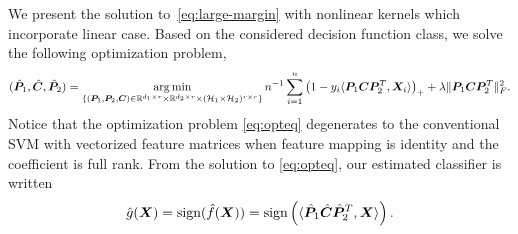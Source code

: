 \documentclass[12pt]{article}
\begin{document}
We present the solution to~\eqref{eq:large-margin} with nonlinear kernels which incorporate linear case. Based on the considered decision function class, we solve the following optimization problem,
\begin{align}
\label{eq:opteq}
(\hat {\bm{P}}_1,\hat{\bm C},\hat{\bm{P}}_2) = \operatorname*{arg\,min}_{\{(\bm{P}_1,\bm{P}_2,\bm C)\in\mathbb{R}^{d_1\times r}\times \mathbb{R}^{d_2\times r}\times (\mathcal{H}_1\times \mathcal{H}_2)^{r\times r}\}}n^{-1}\sum_{i=1}^n \left(1-y_i\langle \bm{P}_1\bm C\bm{P}_2^T,\bm X_i\rangle\right)_++\lambda \lVert\bm{P}_1\bm C\bm{P}_2^T\rVert_F^2.
\end{align}
Notice that the optimization problem \eqref{eq:opteq} degenerates to the conventional SVM with vectorized feature matrices when feature mapping is identity and the coefficient is full rank. From the solution to \eqref{eq:opteq}, our estimated classifier is written 
\begin{align}\label{eq:formulation}\hat g(\bm X) = \text{sign}(\hat f(\bm X)) =  \text{sign}\left(\langle \hat{\bm{P}}_1\hat{\bm C}\hat{\bm{P}}_2^T,\bm X\rangle\right).\end{align}
\end{document}

